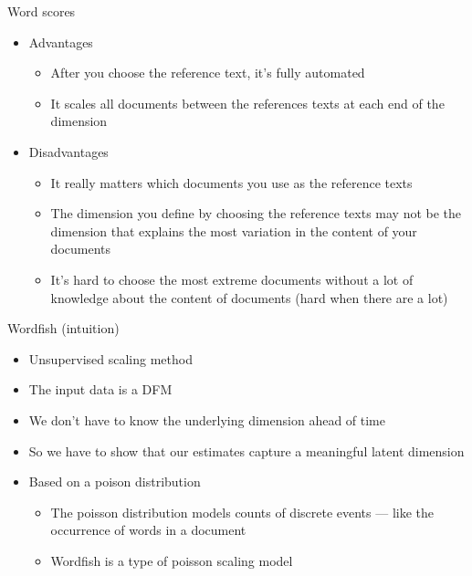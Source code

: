 \documentclass[pdf, 9pt, fleqn, handout]{beamer}
\begin{document}
\begin{frame}{Word scores}
\begin{itemize}
\item  Advantages \\[0.5em]
\begin{itemize}
\item After you choose the reference text, it's fully automated \\[1em]
\item It scales all documents between the references texts at each end of the dimension \\[3em]
\end{itemize}
\item Disadvantages \\[0.5em]
\begin{itemize}
\item It really matters which documents you use as the reference texts \\[1em]
\item The dimension you define by choosing the reference texts may not be the dimension that explains the most variation in the content of your documents \\[1em]
\item It's hard to choose the most extreme documents without a lot of knowledge about the content of documents (hard when there are a lot) 
\end{itemize}
\end{itemize}
\end{frame}

\begin{frame}{Wordfish (intuition)}
\begin{itemize}
\item Unsupervised scaling method \\[1em]
\item The input data is a DFM \\[1em]
\item We don't have to know the underlying dimension ahead of time \\[1em]
\item So we have to show that our estimates capture a meaningful latent dimension \\[1em]
\item Based on a poison distribution \\[0.5em]
\begin{itemize}
\item The poisson distribution models counts of discrete events — like the occurrence of words in a document \\[1em]
\item Wordfish is a type of poisson scaling model
\end{itemize}
\end{itemize}
\end{frame}
\end{document}
